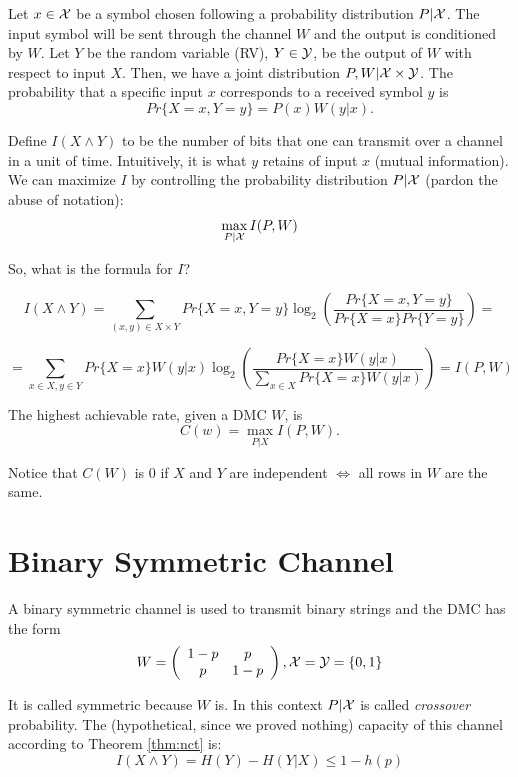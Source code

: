 Let $x \in\mathcal{X}$ be a symbol chosen following a probability distribution $P|\mathcal{X}$. The input symbol will be sent through the channel $W$ and the output is conditioned by $W$. Let $Y$ be the random variable (RV), $Y \in \mathcal{Y}$, be the output of $W$ with respect to input $X$. Then, we have a joint distribution $P, W | \mathcal{X} \times \mathcal{Y}$. The probability that a specific input $x$ corresponds to a received symbol $y$ is
\[Pr\{X=x, Y=y\} = P(x)W(y|x).\]

Define $I(X \wedge Y)$ to be the number of bits that one can transmit over a channel in a unit of time. Intuitively, it is what $y$ retains of input $x$ (mutual information). We can maximize $I$ by controlling the probability distribution $P|\mathcal{X}$ (pardon the abuse of notation): $$\max_{P|\mathcal{X}}I(P, W)$$

So, what is the formula for $I$?

\[
I(X \wedge Y) = \sum_{(x, y)\in X\times Y} Pr\{X=x, Y=y\}\log_2\left(\dfrac{Pr\{X=x, Y=y\}}{Pr\{X=x\}Pr\{Y=y\}}\right) =
\]

\[
= \sum_{x \in X,  y\in Y} Pr\{X=x\}W(y|x)\log_2\left(\dfrac{Pr\{X=x\}W(y|x)}{\sum_{x\in X}Pr\{X=x\}W(y|x)}\right) = I(P, W)
\]

\begin{thm}\label{thm:nct}
	The highest achievable rate, given a DMC $W$, is $$C(w) = \max_{P|X}I(P, W).$$
\end{thm}

Notice that $C(W)$ is 0 if $X$ and $Y$ are independent $\Leftrightarrow$ all rows in $W$ are the same. 

\section{Binary Symmetric Channel}

A binary symmetric channel is used to transmit binary strings and the DMC has the form
\[
W = \left({\begin{array}{cc}
	1-p & p\\
	p & 1-p\\
	\end{array}}\right), \mathcal{X} = \mathcal{Y} = \{0, 1\}
\]

It is called symmetric because $W$ is. In this context $P|\mathcal{X}$ is called \emph{crossover} probability. The (hypothetical, since we proved nothing) capacity of this channel according to Theorem \ref{thm:nct} is:
\[I(X \wedge Y) = H(Y) - H(Y|X) \leq 1 -h(p)\]

